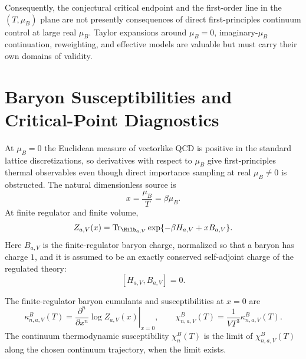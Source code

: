 Consequently, the conjectural critical endpoint and the first-order line in
the \((T,\mu_B)\) plane are not presently consequences of direct
first-principles continuum control at large real \(\mu_B\).  Taylor
expansions around \(\mu_B=0\), imaginary-\(\mu_B\) continuation, reweighting,
and effective models are valuable but must carry their own domains of
validity.

\section{Baryon Susceptibilities and Critical-Point Diagnostics}
\label{sec:qcd-baryon-susceptibilities-criticality}

At \(\mu_B=0\) the Euclidean measure of vectorlike QCD is positive in the
standard lattice discretizations, so derivatives with respect to
\(\mu_B\) give first-principles thermal observables even though direct
importance sampling at real \(\mu_B\ne0\) is obstructed.  The natural
dimensionless source is
\[
  x=\frac{\mu_B}{T}=\beta\mu_B .
\]
At finite regulator and finite volume,
\begin{equation}
  Z_{a,V}(x)
  =
  \operatorname{Tr}_{\Hilb_{a,V}}
  \exp\{-\beta H_{a,V}+xB_{a,V}\}.
  \label{eq:qcd-baryon-finite-x-partition}
\end{equation}
Here \(B_{a,V}\) is the finite-regulator baryon charge, normalized so that a
baryon has charge \(1\), and it is assumed to be an exactly conserved
self-adjoint charge of the regulated theory:
\[
  [H_{a,V},B_{a,V}]=0 .
\]

\begin{definition}
\label{def:qcd-baryon-susceptibilities}
The finite-regulator baryon cumulants and susceptibilities at \(x=0\) are
\begin{equation}
  \kappa_{n,a,V}^{B}(T)
  =
  \left.
  \frac{\partial^n}{\partial x^n}\log Z_{a,V}(x)
  \right|_{x=0},
  \qquad
  \chi_{n,a,V}^{B}(T)
  =
  \frac{1}{VT^3}\kappa_{n,a,V}^{B}(T).
  \label{eq:qcd-baryon-susceptibility-definition}
\end{equation}
The continuum thermodynamic susceptibility \(\chi_n^B(T)\) is the limit of
\(\chi_{n,a,V}^{B}(T)\) along the chosen continuum trajectory, when the
limit exists.
\end{definition}

